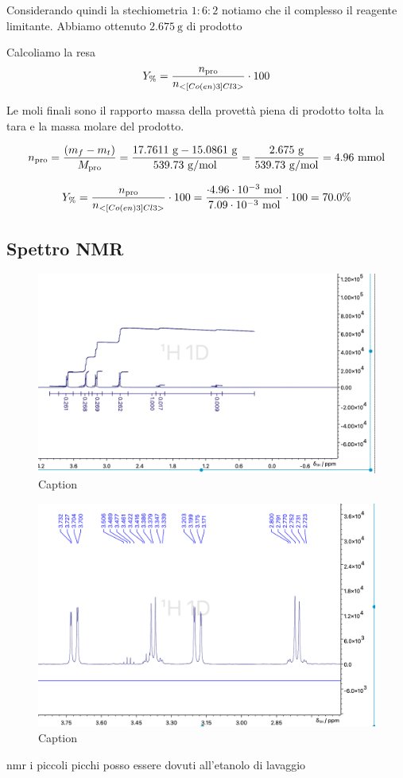 Considerando quindi la stechiometria $1: 6: 2$ notiamo che il complesso il reagente limitante. Abbiamo ottenuto $ 2.675 \mathrm{~g}$ di prodotto



Calcoliamo la resa 
\[ Y_\% = \frac{n_\text{pro}}{n_{<[Co(en)3]Cl3>}}\cdot 100 \]

Le moli finali sono il rapporto massa della provettà piena di prodotto tolta la tara e la massa molare del prodotto.

\[ n_\text{pro} = \frac{(m_{f} - m_{t})}{M_\text{pro}} 
 = \frac{ 17.7611 \mathrm{\ g} - 15.0861 \mathrm{\ g} }{ 539.73 \mathrm{\ g/mol}} =  \frac{2.675 \mathrm{~g}}{539.73 \mathrm{~g} / \mathrm{mol}}=4.96 \mathrm{\ mmol}\]

\[ Y_\% = \frac{n_\text{pro}}{n_{<[Co(en)3]Cl3>}}\cdot 100  = \frac{ \cdot 4.96 \cdot 10^{-3} \mathrm{~mol}}{7.09 \cdot 10^{-3} \mathrm{~mol}} \cdot 100 =70.0\%\]

\subsection{Spettro NMR}



\begin{figure}
    \centering
    \includegraphics[width=0.8\linewidth]{Relazione/foto/Dinosar_integration_zoom.png}
    \caption{Caption}
    \label{fig:dinosarint}
\end{figure}



\begin{figure}
    \centering
    \includegraphics[width=0.8\linewidth]{Relazione/foto/Dinosar_peak_calc.png}
    \caption{Caption}
    \label{fig:dinosarpeakcalc}
\end{figure}

nmr i piccoli picchi posso essere dovuti all'etanolo di lavaggio


